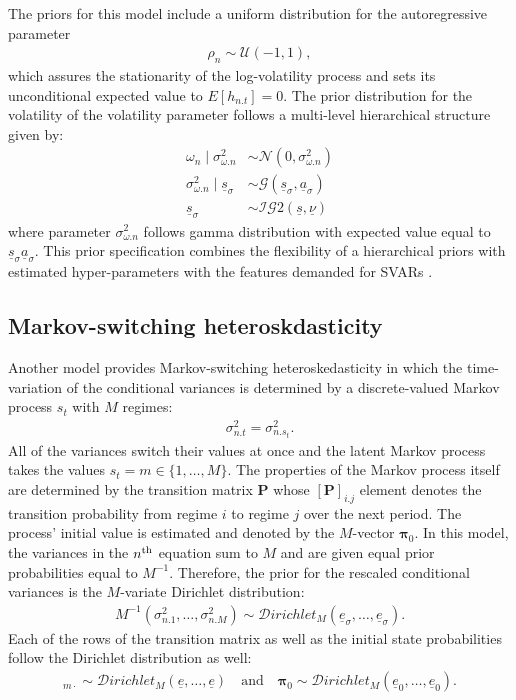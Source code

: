 \documentclass[
  nojss]{jss}
\begin{document}
The priors for this model include a uniform distribution for the
autoregressive parameter \begin{align}
\rho_n \sim\mathcal{U}(-1,1),
\end{align} which assures the stationarity of the log-volatility process
and sets its unconditional expected value to \(E[h_{n.t}]=0\). The prior
distribution for the volatility of the volatility parameter follows a
multi-level hierarchical structure given by: \begin{align}
\omega_n\mid \sigma_{\omega.n}^2 &\sim\mathcal{N}\left(0, \sigma_{\omega.n}^2\right)\\
\sigma_{\omega.n}^2 \mid \underline{s}_\sigma &\sim\mathcal{G}(\underline{s}_\sigma, \underline{a}_\sigma)\\
\underline{s}_\sigma &\sim\mathcal{IG}2(\underline{s}, \underline{\nu})
\end{align} where parameter \(\sigma_{\omega.n}^2\) follows gamma
distribution with expected value equal to
\(\underline{s}_\sigma\underline{a}_\sigma\). This prior specification
combines the flexibility of a hierarchical priors with estimated
hyper-parameters with the features demanded for SVARs
\citep[see][]{LSUW2022}.

\subsection{Markov-switching heteroskdasticity}

Another model provides Markov-switching heteroskedasticity in which the
time-variation of the conditional variances is determined by a
discrete-valued Markov process \(s_t\) with \(M\) regimes: \begin{align}
\sigma_{n.t}^2 = \sigma_{n.s_t}^2.
\end{align} All of the variances switch their values at once and the
latent Markov process takes the values \(s_t = m\in\{1,\dots,M\}\). The
properties of the Markov process itself are determined by the transition
matrix \(\mathbf{P}\) whose \([\mathbf{P}]_{i.j}\) element denotes the
transition probability from regime \(i\) to regime \(j\) over the next
period. The process' initial value is estimated and denoted by the
\(M\)-vector \(\boldsymbol{\pi}_0\). In this model, the variances in the
\(n\textsuperscript{th}\) equation sum to \(M\) and are given equal
prior probabilities equal to \(M^{-1}\). Therefore, the prior for the
rescaled conditional variances is the \(M\)-variate Dirichlet
distribution: \begin{align}
M^{-1}\left(\sigma_{n.1}^2, \dots, \sigma_{n.M}^2\right) \sim\mathcal{D}irichlet_M(\underline{e}_\sigma, \dots, \underline{e}_\sigma). \label{eq:sigmaMSprior}
\end{align} Each of the rows of the transition matrix as well as the
initial state probabilities follow the Dirichlet distribution as well:
\begin{align}
[\mathbf{P}]_{m\cdot} \sim\mathcal{D}irichlet_M(\underline{e}, \dots, \underline{e})\quad\text{and}\quad \boldsymbol{\pi}_0 \sim\mathcal{D}irichlet_M(\underline{e}_0, \dots, \underline{e}_0).
\end{align}
\end{document}
